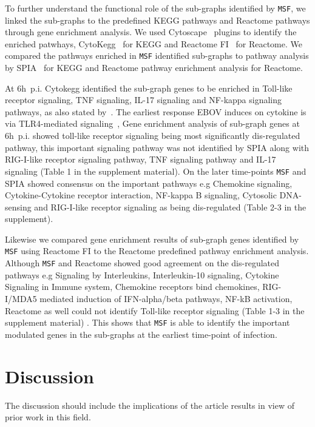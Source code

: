 \documentclass[10pt,a4paper,twocolumn]{article}
\begin{document}
To further understand the functional role of the sub-graphs identified
by \texttt{MSF}, we linked the sub-graphs to the predefined KEGG
pathways and Reactome pathways through gene enrichment analysis. We
used Cytoscape~\cite{Cyto} plugins to identify the enriched patwhays,
CytoKegg~\cite{Cytokegg} for KEGG and Reactome FI~\cite{Reactome} for
Reactome. We compared the pathways enriched in \texttt{MSF} identified
sub-graphs to pathway analysis by SPIA~\cite{Tarca} for KEGG and
Reactome pathway enrichment analysis for Reactome.

At 6h~p.i. Cytokegg identified the sub-graph genes to be enriched in
Toll-like receptor signaling, TNF signaling, IL-17 signaling and
NF-kappa signaling pathways, as also stated by~\cite{Olejnik}. The
earliest response EBOV induces on cytokine is via TLR4-mediated
signaling~\cite{Olejnik}, Gene enrichment analysis of sub-graph genes
at 6h~p.i. showed toll-like receptor signaling being most significantly
dis-regulated pathway, this important signaling pathway was not
identified by SPIA along with RIG-I-like receptor signaling pathway,
TNF signaling pathway and IL-17 signaling (Table 1 in the supplement
material). On the later time-points \texttt{MSF} and SPIA showed
consensus on the important pathways e.g Chemokine signaling,
Cytokine-Cytokine receptor interaction, NF-kappa B signaling,
Cytosolic DNA-sensing and RIG-I-like receptor signaling as being
dis-regulated (Table 2-3 in the supplement).

Likewise we compared gene enrichment results of sub-graph genes
identified by \texttt{MSF} using Reactome FI to the Reactome
predefined pathway enrichment analysis. Although \texttt{MSF} and
Reactome showed good agreement on the dis-regulated pathways e.g
Signaling by Interleukins, Interleukin-10 signaling, Cytokine
Signaling in Immune system, Chemokine receptors bind chemokines,
RIG-I/MDA5 mediated induction of IFN-alpha/beta pathways, NF-kB
activation, Reactome as well could not identify Toll-like receptor
signaling (Table 1-3 in the supplement material) . This shows that
\texttt{MSF} is able to identify the important modulated genes in the
sub-graphs at the earliest time-point of infection.


\section*{Discussion}

The discussion should include the implications of the article results
in view of prior work in this field.
\end{document}
